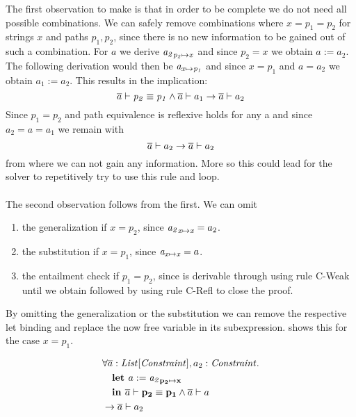 The first observation to make is that in order to be complete
we do not need all possible combinations.
We can safely remove combinations where $x = p_1 = p_2$ for strings $x$ and paths $p_1, p_2$,
since there is no new information to be gained out of such a combination.
For $a$ we derive $\mathit{a_2}_{\mathit{p_2} \mapsto \mathit{x}}$
and since $p_2 = x$ we obtain $a := a_2$.
The following derivation would then be $\mathit{a}_{\mathit{x} \mapsto \mathit{p_1}}$
and since $x = p_1$ and $a = a_2$ we obtain $a_1 := a_2$.
This results in the implication:
\[ \overline{a} \vdash \mathit{p_2} \equiv \mathit{p_1} \land \overline{a} \vdash a_1 \rightarrow \overline{a} \vdash a_2 \]
Since $p_1 = p_2$ and path equivalence is reflexive
 holds for any \ovl a
and since $a_2 = a = a_1$ we remain with
\[ \overline{a} \vdash a_2 \rightarrow \overline{a} \vdash a_2 \]
from where we can not gain any information.
More so this could lead for the solver to repetitively try to use this rule
and loop.\\
\\
The second observation follows from the first.
We can omit
\begin{enumerate}
    \item the generalization  if $x = p_2$,
          since $\mathit{a_2}_{\mathit{x} \mapsto \mathit{x}} = a_2$.
    \item the substitution  if $x = p_1$,
          since $\mathit{a}_{\mathit{x} \mapsto \mathit{x}} = a$.
    \item the entailment check  if $p_1 = p_2$,
          since  is derivable through using rule C-Weak
          until we obtain  followed
          by using rule C-Refl to close the proof.
\end{enumerate}
By omitting the generalization or the substitution
we can remove the respective let binding
and replace the now free variable in its subexpression.
 shows this for the case $x = p_1$.
\begin{example}[Optimized subst rule with $x = p_1$]
\label{ex:subst-optimzed}
\begin{align*}
&\forall \overline{a}: \mathit{List[\mathit{Constraint}]}, a_2: \mathit{Constraint}.\\
&\quad \textbf{let } a := \mathit{a_2}_{\mathit{\mathbf{p_2}} \mapsto \mathit{\mathbf{x}}}\\
&\quad \textbf{in }
       \overline{a} \vdash \mathit{\mathbf{p_2}} \equiv \mathit{\mathbf{p_1}}
       \land
       \overline{a} \vdash a\\
&\rightarrow \overline{a} \vdash a_2
\end{align*}
\end{example}
%
